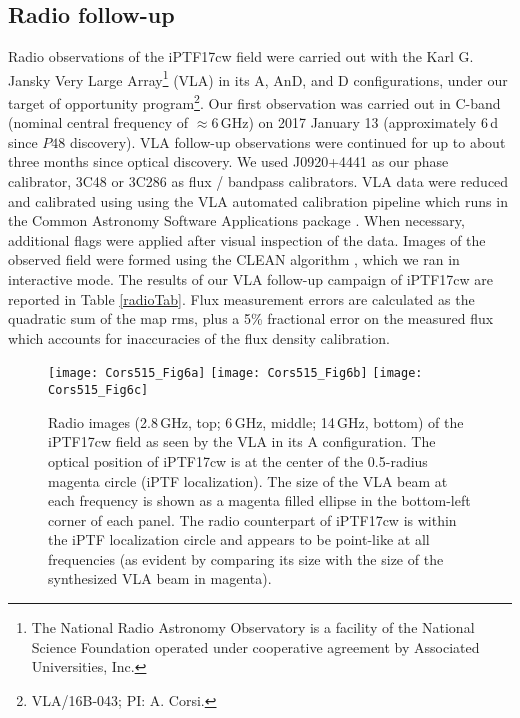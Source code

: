 \documentclass[twocolumn]{emulateapj}
\begin{document}
\subsection{Radio follow-up}
\label{Radioobservations}
Radio observations of the iPTF17cw field were carried out with the Karl G. Jansky Very Large Array\footnote{The National Radio Astronomy Observatory is a facility of the National Science Foundation 
operated under cooperative agreement by Associated Universities, Inc.} (VLA) 
in its A, AnD, and D configurations, under our target of opportunity program\footnote{VLA/16B-043; PI: A. Corsi.}. 
Our first observation was carried out in C-band (nominal central frequency of $\approx 6$\,GHz) on 2017 January 13 
(approximately 6\,d since $P48$ discovery). VLA follow-up observations were continued for up to about three months 
since optical discovery. We used J0920+4441 as our phase calibrator, 3C48 or 3C286 as flux / bandpass calibrators.
VLA data were reduced and calibrated using using the VLA automated calibration pipeline which runs in the Common 
Astronomy Software Applications package \citep[CASA;][]{McMullin2007}. When necessary, additional flags were applied after visual inspection of the data. 
Images of the observed field were formed using the CLEAN algorithm \citep{Hogbom1974}, which we ran in 
interactive mode. The results of our VLA follow-up campaign of iPTF17cw are reported in Table \ref{radioTab}. Flux measurement errors are calculated as the quadratic sum of the map rms, plus a 5\% fractional error on the measured flux which accounts for inaccuracies of
the flux density calibration.

\begin{figure}
\vbox{
\texttt{[image: Cors515\_Fig6a]}
\texttt{[image: Cors515\_Fig6b]}
\texttt{[image: Cors515\_Fig6c]}}
\caption{Radio images (2.8\,GHz, top; 6\,GHz, middle; 14\,GHz, bottom) of the iPTF17cw field as seen by the VLA in its A configuration. The optical position of iPTF17cw is at the center of the 0.5\arcsec-radius magenta circle (iPTF localization). The size of the VLA beam at each frequency is shown as a magenta filled ellipse in the bottom-left corner of each panel. The radio counterpart of iPTF17cw is within the iPTF localization circle and appears to be point-like at all frequencies (as evident by comparing its size with the size of the synthesized VLA beam in magenta). \label{fig:radiodiscovery}}
\end{figure}
\end{document}
